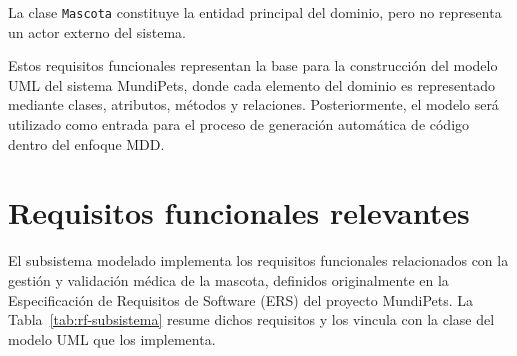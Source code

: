 \documentclass[10pt,a4paper,openany]{report}
\begin{document}
	La clase \texttt{Mascota} constituye la entidad principal del dominio,
	pero no representa un actor externo del sistema.
	
	Estos requisitos funcionales representan la base para la construcción del modelo UML
	del sistema MundiPets, donde cada elemento del dominio es representado mediante
	clases, atributos, métodos y relaciones. Posteriormente, el modelo será utilizado como
	entrada para el proceso de generación automática de código dentro del enfoque MDD.
	
	\section{Requisitos funcionales relevantes}
	
	El subsistema modelado implementa los requisitos funcionales
	relacionados con la gestión y validación médica de la mascota,
	definidos originalmente en la Especificación de Requisitos de Software
	(ERS) del proyecto MundiPets. La Tabla~\ref{tab:rf-subsistema} resume
	dichos requisitos y los vincula con la clase del modelo UML que los
	implementa.
	
\end{document}

